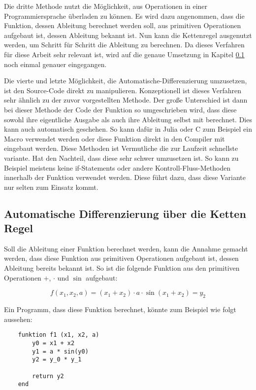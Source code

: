 Die dritte Methode nutzt die Möglichkeit, aus Operationen 
in einer Programmiersprache überladen zu können.
Es wird dazu angenommen, dass die Funktion, dessen Ableitung berechnet werden soll, aus primitiven Operationen aufgebaut ist, dessen Ableitung bekannt ist.
Nun kann die Kettenregel ausgenutzt werden, um Schritt für Schritt die Ableitung zu berechnen.
Da dieses Verfahren für diese Arbeit sehr relevant ist, wird auf die genaue Umsetzung in Kapitel \ref{sec:ketten_regel} noch einmal genauer eingegangen.

Die vierte und letzte Möglichkeit, die Automatische-Differenzierung umzusetzen, ist den Source-Code direkt zu manipulieren.
Konzeptionell ist dieses Verfahren sehr ähnlich zu der zuvor vorgestellten Methode. 
Der große Unterschied ist dann bei dieser Methode der Code der Funktion so umgeschrieben wird, 
dass diese sowohl ihre eigentliche Ausgabe als auch ihre Ableitung selbst mit berechnet.
Dies kann auch automatisch geschehen.
So kann dafür in Julia oder C zum Beispiel ein Macro verwendet werden oder diese Funktion direkt in den Compiler mit eingebaut werden.
Diese Methoden ist Vermutliche die zur Laufzeit schnellste variante.
Hat den Nachteil, dass diese sehr schwer umzusetzen ist.
So kann zu Beispiel meistens keine if-Statements oder andere Kontroll-Fluss-Methoden innerhalb der Funktion verwendet werden. 
Diese führt dazu, dass diese Variante nur selten zum Einsatz kommt.

\subsection{Automatische Differenzierung über die Ketten Regel} \label{sec:ketten_regel}

Soll die Ableitung einer Funktion berechnet werden, 
kann die Annahme gemacht werden, 
dass diese Funktion aus primitiven Operationen aufgebaut ist, dessen Ableitung bereits bekannt ist.
So ist die folgende Funktion aus den primitiven Operationen $+$, $\cdot$ und $\sin$ aufgebaut:

$$
f(x_1, x_2, a) = (x_1 + x_2) \cdot a \cdot \sin(x_1 + x_2) = y_2
$$

Ein Programm, dass diese Funktion berechnet, könnte zum Beispiel wie folgt aussehen:

\begin{lstlisting}
    funktion f1 (x1, x2, a)
        y0 = x1 + x2
        y1 = a * sin(y0)
        y2 = y_0 * y_1
        
    	return y2
    end
\end{lstlisting}

